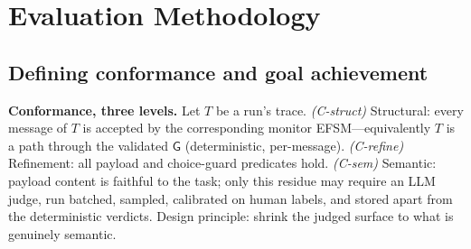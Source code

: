\documentclass{article}
\newcommand{\gtG}{\mathsf{G}}
\begin{document}
\section{Evaluation Methodology}\label{sec:method}
\subsection{Defining conformance and goal achievement}
\textbf{Conformance, three levels.} Let $T$ be a run's trace. \emph{(C-struct)} Structural: every message of $T$ is accepted by the corresponding monitor EFSM---equivalently $T$ is a path through the validated $\gtG$ (deterministic, per-message). \emph{(C-refine)} Refinement: all payload and choice-guard predicates hold. \emph{(C-sem)} Semantic: payload content is faithful to the task; only this residue may require an LLM judge, run batched, sampled, calibrated on human labels, and stored apart from the deterministic verdicts. Design principle: shrink the judged surface to what is genuinely semantic.
\end{document}
